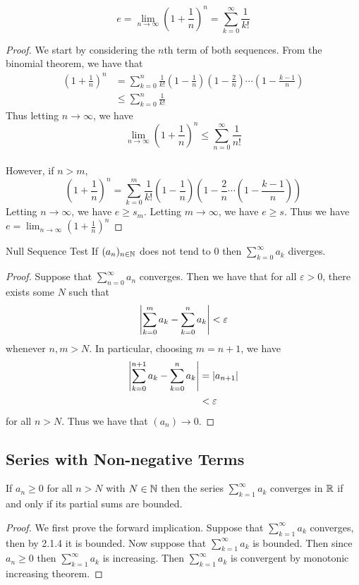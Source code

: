 \documentclass[a4paper]{article}
\begin{document}
\begin{prp}{}{} $$e=\lim_{n\to\infty}\left(1+\frac{1}{n}\right)^n=\sum_{k=0}^{\infty}\frac{1}{k!}$$ \tcbline
\begin{proof} We start by considering the $n$th term of both sequences. From the binomial theorem, we have that
\begin{align*}
\left(1+\frac{1}{n}\right)^n&=\sum_{k=0}^{n}\frac{1}{k!}\left(1-\frac{1}{n}\right)\left(1-\frac{2}{n}\right)\cdots\left(1-\frac{k-1}{n}\right)\\
&\leq\sum_{k=0}^{n}\frac{1}{k!}
\end{align*} Thus letting $n\to\infty$, we have $$\lim_{n\to\infty}\left(1+\frac{1}{n}\right)^n\leq\sum_{n=0}^{\infty}\frac{1}{n!}$$\\
However, if $n>m$, $$\left(1+\frac{1}{n}\right)^n=\sum_{k=0}^{m}\frac{1}{k!}\left(1-\frac{1}{n}\right)\left(1-\frac{2}{n}\cdots\left(1-\frac{k-1}{n}\right)\right)$$ Letting $n\to\infty$, we have $e\geq s_m$. Letting $m\to\infty$, we have $e\geq s$. Thus we have $e=\lim_{n\to\infty}\left(1+\frac{1}{n}\right)^n$
\end{proof}
\end{prp}

\begin{thm}{Null Sequence Test}{} If $(a_n)_{n\in\mathbb{N}}$ does not tend to $0$ then $\sum_{k=0}^\infty a_k$ diverges. \tcbline
\begin{proof} Suppose that $\sum_{n=0}^\infty a_n$ converges. Then we have that for all $\varepsilon>0$, there exists some $N$ such that $$\abs{\sum_{k=0}^m a_k-\sum_{k=0}^n a_k}<\varepsilon$$ whenever $n,m>N$. In particular, choosing $m=n+1$, we have
\begin{align*}
\abs{\sum_{k=0}^{n+1} a_k-\sum_{k=0}^n a_k}&=\abs{a_{n+1}}\\
&<\varepsilon
\end{align*} for all $n>N$. Thus we have that $(a_{n})\to 0$. 
\end{proof}
\end{thm}

\subsection{Series with Non-negative Terms}
\begin{thm}{}{} If $a_n\geq 0 $ for all $n>N$ with $N\in\mathbb{N}$ then the series $\sum_{k=1}^\infty a_k$ converges in $\mathbb{R}$ if and only if its partial sums are bounded. \tcbline
\begin{proof} We first prove the forward implication. Suppose that $\sum_{k=1}^\infty a_k$ converges, then by 2.1.4 it is bounded. Now suppose that $\sum_{k=1}^\infty a_k$ is bounded. Then since $a_n\geq0$ then $\sum_{k=1}^\infty a_k$ is increasing. Then $\sum_{k=1}^\infty a_k$ is convergent by monotonic increasing theorem. 
\end{proof}
\end{thm}
\end{document}

